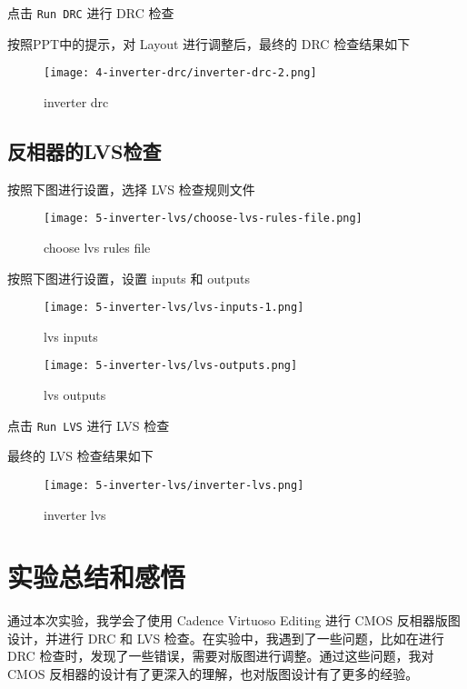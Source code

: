 \documentclass{theme-2614084}
\begin{document}
点击 \texttt{Run DRC} 进行 DRC 检查

按照PPT中的提示，对 Layout 进行调整后，最终的 DRC 检查结果如下

\begin{figure}[H]
  \centering\texttt{[image: 4-inverter-drc/inverter-drc-2.png]}
  \caption{inverter drc}
\end{figure}

\subsection{反相器的LVS检查}

按照下图进行设置，选择 LVS 检查规则文件

\begin{figure}[H]
  \centering\texttt{[image: 5-inverter-lvs/choose-lvs-rules-file.png]}
  \caption{choose lvs rules file}
\end{figure}

按照下图进行设置，设置 inputs 和 outputs

\begin{figure}[htbp]
  \centering\begin{minipage}[t]{0.48\textwidth}
      \centering\texttt{[image: 5-inverter-lvs/lvs-inputs-1.png]}
      \caption{lvs inputs}
  \end{minipage}
  \centering\begin{minipage}[t]{0.48\textwidth}
      \centering\texttt{[image: 5-inverter-lvs/lvs-outputs.png]}
      \caption{lvs outputs}
  \end{minipage}
\end{figure}

点击 \texttt{Run LVS} 进行 LVS 检查

最终的 LVS 检查结果如下

\begin{figure}[H]
  \centering\texttt{[image: 5-inverter-lvs/inverter-lvs.png]}
  \caption{inverter lvs}
\end{figure}

\section{实验总结和感悟}

通过本次实验，我学会了使用 Cadence Virtuoso Editing 进行 CMOS 反相器版图设计，并进行 DRC 和 LVS 检查。在实验中，我遇到了一些问题，比如在进行 DRC 检查时，发现了一些错误，需要对版图进行调整。通过这些问题，我对 CMOS 反相器的设计有了更深入的理解，也对版图设计有了更多的经验。
\end{document}
